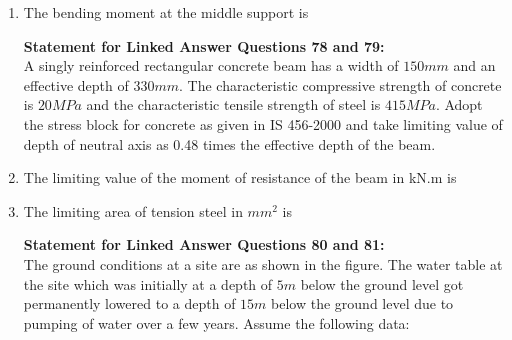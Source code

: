\documentclass[journal]{IEEEtran}
\begin{document}
\begin{enumerate}[start=74]
\item %
The bending moment at the middle support is 
\begin{enumerate}
\end{enumerate}
\textbf{Statement for Linked Answer Questions 78 and 79:}\\
A singly reinforced rectangular concrete beam has a width of $150 mm$ and an effective depth of $330 mm$. The characteristic compressive strength of concrete is $20 MPa$ and the characteristic tensile strength of steel is $415 MPa$. Adopt the stress block for concrete as given in IS 456-2000 and take limiting value of depth of neutral axis as 0.48 times the effective depth of the beam. 
\item %
The limiting value of the moment of resistance of the beam in kN.m is\\
\begin{enumerate}
\end{enumerate}
\item %
The limiting area of tension steel in $mm^2$ is 
\begin{enumerate}
\end{enumerate}
\textbf{Statement for Linked Answer Questions 80 and 81:}\\
The ground conditions at a site are as shown in the figure. The water table at the site which was initially at a depth of $5m$ below the ground level got permanently lowered to a depth of $15m$ below the ground level due to pumping of water over a few years. Assume the following data: \\

\end{enumerate}
\end{document}
